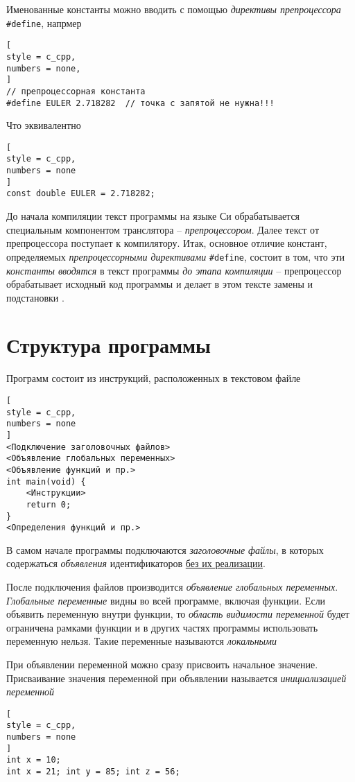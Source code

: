 \documentclass[%
	11pt,
	a4paper,
	utf8,
		]{article}
\begin{document}
Именованные константы можно вводить с помощью \emph{директивы препроцессора} \verb|#define|, напрмер
\begin{lstlisting}[
style = c_cpp,
numbers = none,
]
// препроцессорная константа
#define EULER 2.718282  // точка с запятой не нужна!!!
\end{lstlisting}

Что эквивалентно
\begin{lstlisting}[
style = c_cpp,
numbers = none
]
const double EULER = 2.718282;
\end{lstlisting}

До начала компиляции текст программы на языке Си обрабатывается специальным компонентом транслятора -- \emph{препроцессором}. Далее текст от препроцессора поступает к компилятору. Итак, основное отличие констант, определяемых \emph{препроцессорными директивами} \verb*|#define|, состоит в том, что эти \emph{константы вводятся} в текст программы \emph{до этапа компиляции} -- препроцессор обрабатывает исходный код программы и делает в этом тексте замены и подстановки \cite[]{podbelskiy-prog-c:2005}.

\section{Структура программы}

Программ состоит из инструкций, расположенных в текстовом файле
\begin{lstlisting}[
style = c_cpp,
numbers = none
]
<Подключение заголовочных файлов>
<Объявление глобальных переменных>
<Объявление функций и пр.>
int main(void) {
    <Инструкции>
    return 0;
}
<Определения функций и пр.>
\end{lstlisting}

В самом начале программы подключаются \emph{заголовочные файлы}, в которых содержаться \emph{объявления} идентификаторов \underline{без их реализации}.

После подключения файлов производится \emph{объявление глобальных переменных}. \emph{Глобальные переменные} видны во всей программе, включая функции. Если объявить переменную внутри функции, то \emph{область видимости переменной} будет ограничена рамками функции и в других частях программы использовать переменную нельзя. Такие переменные называются \emph{локальными}

При объявлении переменной можно сразу присвоить начальное значение. Присваивание значения переменной при объявлении называется \emph{инициализацией переменной}
\begin{lstlisting}[
style = c_cpp,
numbers = none
]
int x = 10;
int x = 21; int y = 85; int z = 56;
\end{lstlisting}
\end{document}
